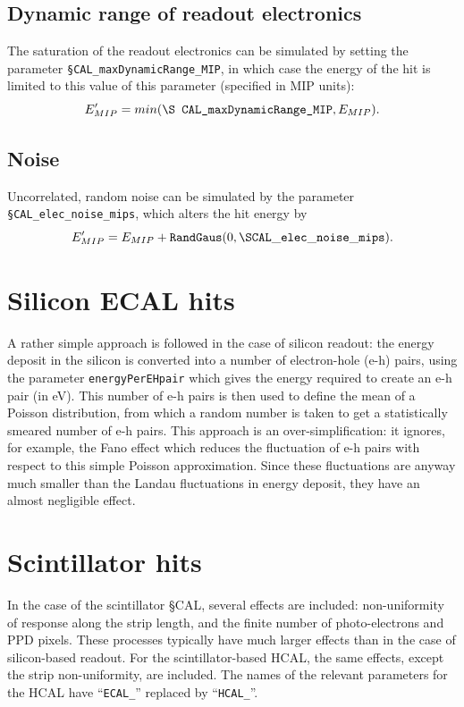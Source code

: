 \documentclass[12pt]{article} %
\begin{document}
\subsection{Dynamic range of readout electronics}
The saturation of the readout electronics can be simulated by setting the parameter {\tt \S CAL\_maxDynamicRange\_MIP},
in which case the energy of the hit is limited to this value of this parameter (specified in MIP units):
\begin{equation*}
E'_{MIP} = min ( \text{\tt \S CAL\_maxDynamicRange\_MIP}, E_{MIP} ).
\end{equation*}

\subsection{Noise}
Uncorrelated, random noise can be simulated by the parameter {\tt \S CAL\_elec\_noise\_mips}, which
alters the hit energy by
\begin{equation*}
E'_{MIP} = E_{MIP} + \text{\tt RandGaus} ( 0, {\tt \S CAL\_elec\_noise\_mips} ).
\end{equation*}

\section{Silicon ECAL hits}

A rather simple approach is followed in the case of silicon readout: 
the energy deposit in the silicon is converted into a number of electron-hole (e-h) pairs,
using the parameter {\tt energyPerEHpair} which gives the energy required to create an e-h pair (in eV).
This number of e-h pairs is then used to define the mean of a Poisson distribution, from which a random number is taken 
to get a statistically smeared number of e-h pairs. 
This approach is an over-simplification: it ignores, for example, the Fano
effect which reduces the fluctuation of e-h pairs with respect to this simple Poisson approximation.
Since these fluctuations are anyway much smaller than the Landau fluctuations in energy deposit, 
they have an almost negligible effect.

\section{Scintillator hits}
\label{sec:scintdigi}


In the case of the scintillator \S CAL, several effects are included: non-uniformity of response along the strip length,
and the finite number of photo-electrons and PPD pixels. 
These processes typically have much larger effects than in the case of silicon-based readout.
For the scintillator-based HCAL, the same effects, except the strip non-uniformity, are included. 
The names of the relevant parameters for the HCAL have ``{\tt ECAL\_}'' replaced by ``{\tt HCAL\_}''.
\end{document}
